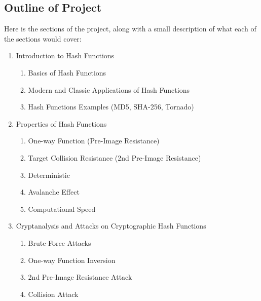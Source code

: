 \documentclass[12pt,english]{article}
\begin{document}
\subsection{Outline of Project}
Here is the sections of the project, along with a small description 
of what each of the sections would cover:
\begin{enumerate}[{\bf (a.)}]
    \item Introduction to Hash Functions
    \begin{enumerate}
        \item Basics of Hash Functions
        \item Modern and Classic Applications of Hash Functions
        \item Hash Functions Examples (MD5, SHA-256, Tornado)
    \end{enumerate} 
    \item Properties of Hash Functions
    \begin{enumerate}
        \item One-way Function (Pre-Image Resistance)
        \item Target Collision Resistance (2nd Pre-Image Resistance)
        \item Deterministic
        \item Avalanche Effect
        \item Computational Speed
    \end{enumerate}
    \item Cryptanalysis and Attacks on Cryptographic Hash Functions
    \begin{enumerate}
        \item Brute-Force Attacks
        \item One-way Function Inversion
        \item 2nd Pre-Image Resistance Attack
        \item Collision Attack
    \end{enumerate}
\end{enumerate}
\end{document}
